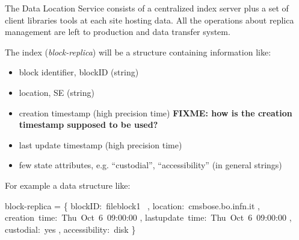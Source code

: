\documentclass[pdftex]{cmspaper}
\begin{document}
The Data Location Service consists of a centralized index 
server plus a set of client libraries tools at each site hosting data. 
All the operations about replica management are left to production
and data transfer system.

The index ({\em block-replica}) will be a structure containing 
information like: 
\begin{itemize}
\item block identifier, blockID  (string)
\item location, SE (string)
\item creation timestamp  (high precision time)  {\bf FIXME: how is the creation timestamp supposed to be used?}
\item last update timestamp (high precision time)
\item few state attributes, e.g. ``custodial'', ``accessibility'' (in general strings)
\end{itemize}

For example a data structure like:
\begin{flushleft}
\mbox{block-replica} = \{
     \mbox{blockID: fileblock1 } ,
     \mbox{location: cmsbose.bo.infn.it} ,
     \mbox{creation time:   Thu Oct 6 09:00:00} ,
     \mbox{lastupdate time: Thu Oct 6 09:00:00} ,
     \mbox{custodial:       yes} ,
     \mbox{accessibility:   disk}
 \}
\end{flushleft}
\end{document}
